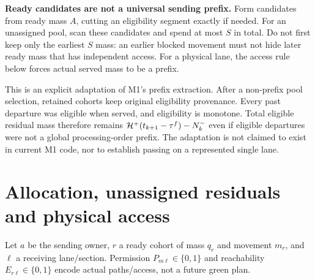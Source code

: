 \documentclass[10pt,a4paper]{article}
\begin{document}
\textbf{Ready candidates are not a universal sending prefix.}
Form candidates from ready mass $A$, cutting an eligibility segment
exactly if needed. For an unassigned pool, scan these candidates and
spend at most $S$ in total. Do not first keep only the earliest $S$
mass: an earlier blocked movement must not hide later ready mass that
has independent access. For a physical lane, the access rule below forces
actual served mass to be a prefix.

This is an explicit adaptation of M1's prefix extraction. After a
non-prefix pool selection, retained cohorts keep original eligibility
provenance. Every past departure was eligible when served, and eligibility
is monotone. Total eligible residual mass therefore remains
${\cal H}^+(t_{k+1}-\tau^f)-N^-_k$ even if eligible departures were not
a global processing-order prefix. The adaptation is not claimed to exist
in current M1 code, nor to establish passing on a represented single lane.

\section{Allocation, unassigned residuals and physical access}

Let $a$ be the sending owner, $r$ a ready cohort of mass $q_r$ and
movement $m_r$, and $\ell$ a receiving lane/section.
Permission $P_{m\ell}\in\{0,1\}$ and reachability
$E_{r\ell}\in\{0,1\}$ encode actual paths/access, not a future green plan.
\end{document}
